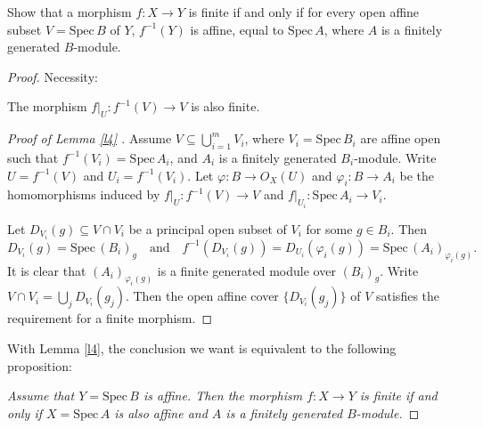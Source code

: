\begin{exe}
	\label{2.3.4}
	Show that a morphism $f:X\rightarrow Y$ is finite if and only if for every open affine subset $V=\mathrm{Spec}\,B$
	of $Y$, $f^{-1}(Y)$ is affine, equal to $\mathrm{Spec}\,A$, where $A$ is a finitely generated $B$-module.
\end{exe}

\begin{proof}
	Necessity:\begin{lm}
		\label{l4}
		The morphism $f|_U:f^{-1}(V)\to V$ is also finite.
	\end{lm}
	\begin{proof}[Proof of Lemma \ref*{l4} ]
		Assume $V\subseteq\bigcup_{i=1}^mV_i$, where $V_i=\mathrm{Spec}\,B_i$ are affine open such that $f^{-1}(V_i)=\mathrm{Spec}\,A_i$, and $A_i$ is a finitely generated $B_i$-module. Write $U=f^{-1}(V)$ and $U_i=f^{-1}(V_i)$. Let $\varphi: B\rightarrow O_X(U)$ and $\varphi_i: B\rightarrow A_i$ be the homomorphisms induced by $f|_U: f^{-1}(V) \rightarrow V$ and $f|_{U_i}: \mathrm{Spec}\,A_i \rightarrow V_i$.
		
		Let $D_{V_i}(g)\subseteq V\cap V_i$ be a principal open subset of $V_i$ for some $g\in B_i$. Then $$D_{V_i}(g)=\mathrm{Spec}\,(B_i)_g\quad\text{and}\quad f^{-1}(D_{V_i}(g))=D_{U_i}(\varphi_i(g))=\mathrm{Spec}\,(A_i)_{\varphi_i(g)}.$$ It is clear that $(A_i)_{\varphi_i(g)}$ is a finite generated module over $(B_i)_g$. Write $V\cap V_i=\bigcup_j D_{V_i}(g_j)$. Then the open affine cover $\{D_{V_i}(g_j)\}$ of $V$ satisfies the requirement for a finite morphism.
	\end{proof}
	With Lemma \ref{l4}, the conclusion we want is equivalent to the following proposition:
	
	\emph{Assume that $Y=\mathrm{Spec}\,B$ is affine. Then the morphism $f:X\to Y$ is finite if and only if $X=\mathrm{Spec}\,A$ is also affine and $A$ is a finitely generated $B$-module.}
	

\end{proof}
